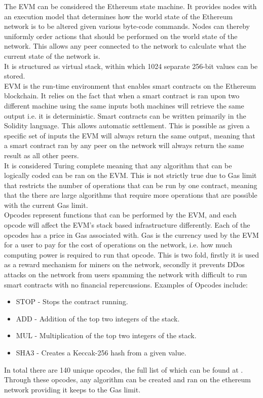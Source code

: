 The EVM can be considered the Ethereum state machine. It provides nodes with an execution model that determines how the world state of the Ethereum network is to be altered given various byte-code commands.  Nodes can thereby uniformly order actions that should be performed on the world state of the network. This allows any peer connected to the network to calculate what the current state of the network is. \\

It is structured as virtual stack, within which 1024 separate 256-bit values can be stored. \\  

EVM is the run-time environment that enables smart contracts on the Ethereum blockchain. It relies on the fact that when a smart contract is ran upon two different machine using the same inputs both machines will retrieve the same output i.e. it is deterministic. Smart contracts can be written primarily in the Solidity language. This allows automatic settlement. This is possible as given a specific set of inputs the EVM will always return the same output, meaning that a smart contract ran by any peer on the network will always return the same result as all other peers. \\

It is considered Turing complete meaning that any algorithm that can be logically coded can be ran on the EVM. This is not strictly true due to Gas limit that restricts the number of operations that can be run by one contract, meaning that the there are large algorithms that require more operations that are possible with the current Gas limit.  \\
 

Opcodes represent functions that can be performed by the EVM, and each opcode will affect the EVM's stack based infrastructure differently. Each of the opcodes has a price in Gas associated with. Gas is the currency used by the EVM for a user to pay for the cost of operations on the network, i.e. how much computing power is required to run that opcode. This is two fold, firstly it is used as a reward mechanism for miners on the network, secondly it prevents DDos attacks on the network from users spamming the network with difficult to run smart contracts with no financial repercussions. Examples of Opcodes include: \\

\begin{itemize}

\item STOP - Stops the contract running.
\item ADD - Addition of the top two integers of the stack.
\item MUL - Multiplication of the top two integers of the stack.
\item SHA3 - Creates a Keccak-256 hash from a given value. \\

\end{itemize} 

In total there are 140 unique opcodes, the full list of which can be found at \cite{Opcodes}. Through these opcodes, any algorithm can be created and ran on the ethereum network providing it keeps to the Gas limit. 